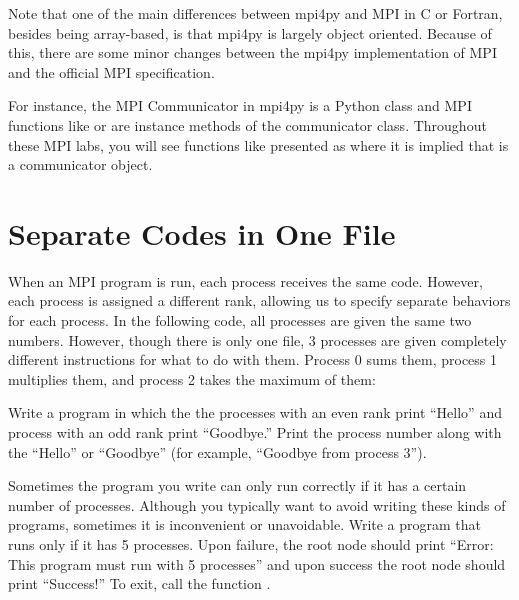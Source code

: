 Note that one of the main differences between mpi4py and MPI in C or Fortran, 
besides being array-based, is that mpi4py is largely object oriented. 
Because of this, there are some minor changes between the mpi4py implementation of 
MPI and the official MPI specification.

For instance, the MPI Communicator in mpi4py is a Python class and MPI functions 
like  or  are instance methods of the communicator class. 
Throughout these MPI labs, you will see functions like  presented as 
 where it is implied that  is a communicator object.

\section*{Separate Codes in One File}
When an MPI program is run, each process receives the same code. 
However, each process is assigned a different rank, allowing us to specify separate 
behaviors for each process. In the following code, all processes are given the same two numbers. 
However, though there is only one file, 3 processes are given completely different instructions 
for what to do with them. Process 0 sums them, process 1 multiplies them, 
and process 2 takes the maximum of them:


\begin{problem}
Write a program in which the the processes with an even rank print ``Hello'' and 
process with an odd rank print ``Goodbye.'' 
Print the process number along with the ``Hello'' or ``Goodbye'' 
(for example, ``Goodbye from process 3'').
\end{problem}

\begin{problem}
Sometimes the program you write can only run correctly if it has a certain number of processes. 
Although you typically want to avoid writing these kinds of programs, sometimes it is 
inconvenient or unavoidable. Write a program that runs only if it has 5 processes. 
Upon failure, the root node should print ``Error: This program must run with 5 processes'' 
and upon success the root node should print ``Success!'' To exit, call the function 
.
\end{problem}
